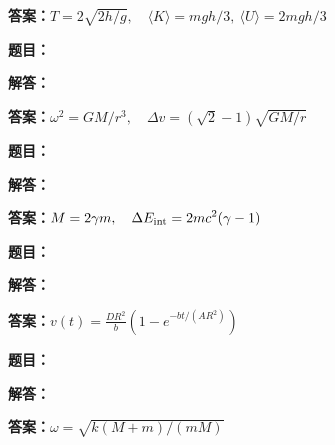 \documentclass[lang=cn,color=blue,11pt]{elegantbook}
\begin{document}
\par\noindent\textbf{答案：}\(\displaystyle T=2\sqrt{2h/g},\quad\langle K\rangle=mgh/3,\ \langle U\rangle=2mgh/3\)\par
\par\smallskip\noindent\hrulefill\par\medskip
{}\par
\noindent\textbf{题目：}
\par\noindent\textbf{解答：}
\par\noindent\textbf{答案：}\(\displaystyle \omega^2=GM/r^3,\quad \Delta v=(\sqrt2-1)\sqrt{GM/r}\)\par
\par\smallskip\noindent\hrulefill\par\medskip
{}\par
\noindent\textbf{题目：}
\par\noindent\textbf{解答：}
\par\noindent\textbf{答案：}\(\displaystyle M=2\gamma m,\quad\Delta E_{\rm int}=2mc^2(\gamma-1)\)\par
\par\smallskip\noindent\hrulefill\par\medskip
{}\par
\noindent\textbf{题目：}
\par\noindent\textbf{解答：}
\par\noindent\textbf{答案：}\(\displaystyle v(t)=\frac{DR^2}{b}(1-e^{-bt/(AR^2)})\)\par
\par\smallskip\noindent\hrulefill\par\medskip
{}\par
\noindent\textbf{题目：}
\par\noindent\textbf{解答：}
\par\noindent\textbf{答案：}\(\displaystyle \omega=\sqrt{k(M+m)/(mM)}\)\par
\end{document}
